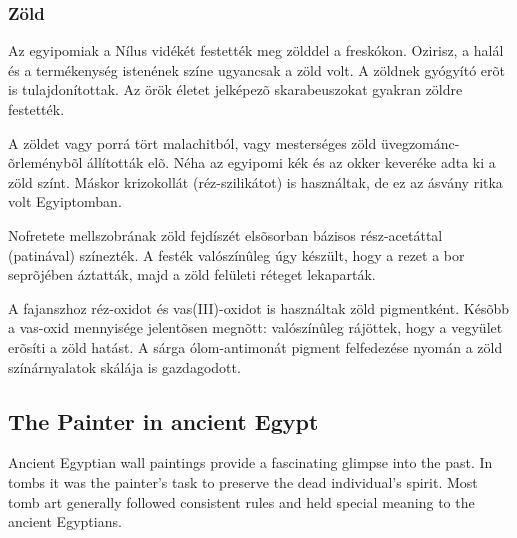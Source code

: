 	\subsubsection{Zöld}
	
	Az egyipomiak a Nílus vidékét festették meg zölddel a freskókon. Ozirisz, a halál és a termékenység istenének színe ugyancsak a zöld volt. A zöldnek gyógyító erõt is tulajdonítottak. Az örök életet jelképezõ skarabeuszokat gyakran zöldre festették.
	
	A zöldet vagy porrá tört malachitból, vagy mesterséges zöld üvegzománc-õrleménybõl állították elõ. Néha az egyipomi kék és az okker keveréke adta ki a zöld színt. Máskor krizokollát (réz-szilikátot) is használtak, de ez az ásvány ritka volt Egyiptomban.
	
	Nofretete mellszobrának zöld fejdíszét elsõsorban bázisos rész-acetáttal (patinával) színezték. A festék valószínûleg úgy készült, hogy a rezet a bor seprõjében áztatták, majd a zöld felületi réteget lekaparták.
	
	A fajanszhoz réz-oxidot és vas(III)-oxidot is használtak zöld pigmentként. Késõbb a vas-oxid mennyisége jelentõsen megnõtt: valószínûleg rájöttek, hogy a vegyület erõsíti a zöld hatást. A sárga ólom-antimonát pigment felfedezése nyomán a zöld színárnyalatok skálája is gazdagodott.
	
	\subsection{The Painter in ancient Egypt} 
	

	Ancient Egyptian wall paintings provide a fascinating glimpse into the past. In tombs it was the painter's task to preserve the dead individual's spirit. Most tomb art generally followed consistent rules and held special meaning to the ancient Egyptians.
		
